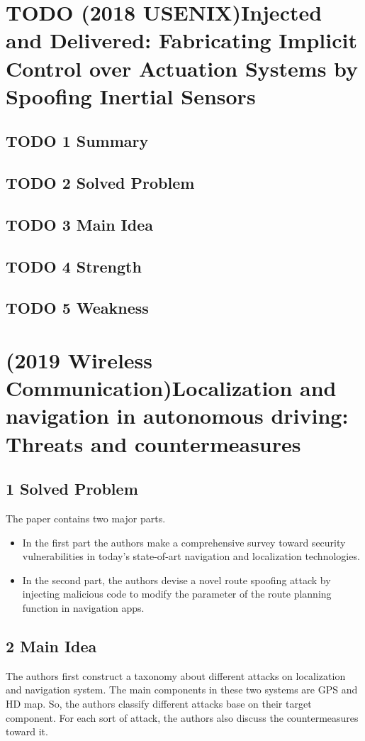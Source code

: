 \documentclass[11pt]{article}
\author{lijin}
\date{\today}
\title{}
\begin{document}
\tableofcontents

\section{{\bfseries\sffamily TODO} (2018 USENIX)Injected and Delivered: Fabricating Implicit Control over Actuation Systems by Spoofing Inertial Sensors}
\label{sec:orgdb42eb6}
\subsection{{\bfseries\sffamily TODO} 1 Summary}
\label{sec:orgdf2b0da}
\subsection{{\bfseries\sffamily TODO} 2 Solved Problem}
\label{sec:orgdfb409c}
\subsection{{\bfseries\sffamily TODO} 3 Main Idea}
\label{sec:org37af977}
\subsection{{\bfseries\sffamily TODO} 4 Strength}
\label{sec:orgc283033}
\subsection{{\bfseries\sffamily TODO} 5 Weakness}
\label{sec:org209cc5d}

\section{(2019 Wireless Communication)Localization and navigation in autonomous driving: Threats and countermeasures}
\label{sec:orgde058bf}
\subsection{1 Solved Problem}
\label{sec:orgd485d1b}
The paper contains two major parts.
\begin{itemize}
\item In the first part the authors make a comprehensive survey toward security vulnerabilities in today's state-of-art navigation and localization technologies.
\item In the second part, the authors devise a novel route spoofing attack by injecting malicious code to modify the parameter of the route planning function in navigation apps.
\end{itemize}
\subsection{2 Main Idea}
\label{sec:orgbdc552d}

The authors first construct a taxonomy about different attacks on localization and navigation system. The main components in these two systems are GPS and HD map. So, the authors classify different attacks base on their target component. For each sort of attack, the authors also discuss the countermeasures toward it.
\end{document}
